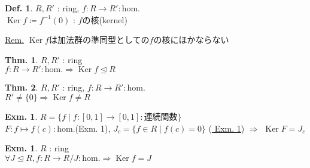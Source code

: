 \documentclass[uplatex,dvipdfmx,9pt]{beamer}
\newcommand{\inverse}[1]{#1^{-1}}
\newcommand{\Ker}{\operatorname{Ker}}
\newcommand{\ideal}{\trianglelefteq}
\renewcommand{\hom}{\text{hom.}} %
\newcounter{textExmCount}
\theoremstyle{definition} %
\newtheorem{defn}{Def.}[subsection] %
\newtheorem{thm}{Thm.}[subsection] %
\theoremstyle{example}
\newtheorem{exmText}[textExmCount]{Exm.}
\begin{document}
    \begin{frame}
      
      \begin{defn}
        $R, R'$ : ring, $f\colon R \to R' : \hom$ \\
        $\Ker f \coloneqq \inverse{f}(0)$ : $f$の\alert{核(kernel)}
      \end{defn}
      \underline{Rem.} $\Ker f$は加法群の準同型としての$f$の核にほかならない

      \begin{thm}
        $R, R'$ : ring \\
        $f\colon R \to R' : \hom \Rightarrow \Ker f \ideal R$
      \end{thm}

      \begin{thm}
        $R, R'$ : ring, $f\colon R \to R' : \hom$ \\
        $R'\neq \{0\} \Rightarrow \Ker f \neq R$
      \end{thm}

    \end{frame}

    \begin{frame}

      \begin{exmText}
        $R = \{f \mid f\colon [0, 1] \to [0, 1] : \text{連続関数}\}$ \\
        $F\colon f \mapsto f(c) : \hom$(Exm. 1), $J_c = \{f \in R \mid f(c) = 0\}$ (\hyperlink{exmText3-1}{ Exm. 1}) $\Rightarrow$ $\Ker F = J_c$
      \end{exmText}

      \begin{exmText}
        $R$ : ring \\
        $\forall J \ideal R, f\colon R \to R/J : \hom \Rightarrow \Ker f = J$
      \end{exmText}
      
    \end{frame}
\end{document}
